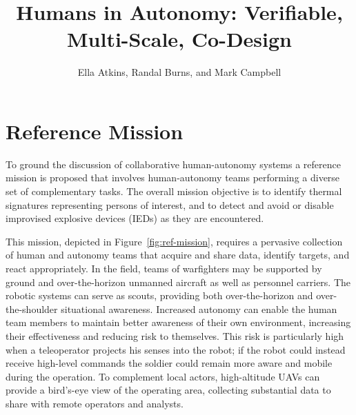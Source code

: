 \documentclass[11pt]{dssg}
\begin{document}
\title{Humans in Autonomy: Verifiable, Multi-Scale, Co-Design}

\author{Ella Atkins, Randal Burns, and Mark Campbell}

\maketitle














%
\section*{Reference Mission}

To ground the discussion of collaborative human-autonomy systems a reference mission is proposed
that involves human-autonomy teams performing a diverse set of complementary tasks.  The overall
mission objective is to identify thermal signatures representing persons of interest, and to detect and avoid
or disable improvised explosive devices (IEDs) as they are encountered.

This mission, depicted in Figure~\ref{fig:ref-mission}, requires a pervasive collection of human and autonomy teams that
acquire and share data, identify targets, and react appropriately.  In the field, teams of warfighters may be supported by ground and over-the-horizon unmanned aircraft as well as personnel carriers.  The robotic systems can serve as scouts, providing both over-the-horizon and over-the-shoulder situational awareness.  Increased autonomy can enable the human team members to maintain better awareness of their own environment, increasing their effectiveness and reducing risk to themselves.  This risk is particularly high when a teleoperator projects his senses into the robot; if the robot could instead receive high-level commands the soldier could remain more aware and mobile during the operation.  To complement local actors, high-altitude UAVs can provide a bird's-eye view of the operating area, collecting substantial data to share with remote operators and analysts.
\end{document}
